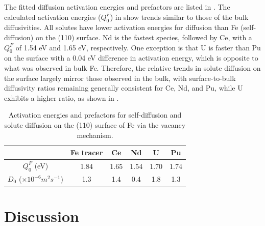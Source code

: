\documentclass[preprint,12pt]{elsarticle}
\begin{document}
The fitted diffusion activation energies and prefactors are listed in . The calculated activation energies ($Q_0^F$) in  show trends similar to those of the bulk diffusivities. All solutes have lower activation energies for diffusion than Fe (self-diffusion) on the (110) surface. Nd is the fastest species, followed by Ce, with a $Q_0^F$ of 1.54 eV and 1.65 eV, respectively. One exception is that U is faster than Pu on the surface with a 0.04 eV difference in activation energy, which is opposite to what was observed in bulk Fe. Therefore, the relative trends in solute diffusion on the surface largely mirror those observed in the bulk, with surface-to-bulk diffusivity ratios remaining generally consistent for Ce, Nd, and Pu, while U exhibits a higher ratio, as shown in .

\begin{table}[!ht]
    \centering
    \caption{Activation energies and prefactors for self-diffusion and solute diffusion on the (110) surface of Fe via the vacancy mechanism.}
    \begin{tabular}{|c|c|c|c|c|c|}
    \hline
                & Fe tracer & Ce    & Nd    & U     & Pu \\
    \hline
    $Q_0^F$ (eV)& 1.84      & 1.65  &  1.54 & 1.70  & 1.74\\
    $D_0$ ($\times 10^{-6} m^2s^{-1}$)
                & 1.3       & 1.4   & 0.4   & 1.8   & 1.3\\
    \hline
    \end{tabular}
    \label{tab:surface_activation_energies}
\end{table}

\FloatBarrier
\section{Discussion}
\end{document}
